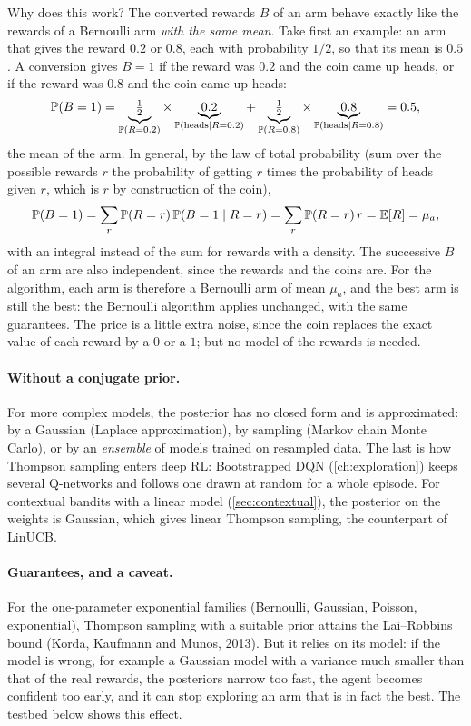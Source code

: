 Why does this work? The converted rewards $B$ of an arm behave exactly like
the rewards of a Bernoulli arm \emph{with the same mean}. Take first an
example: an arm that gives the reward $0.2$ or $0.8$, each with probability
$1/2$, so that its mean is $0.5$. A conversion gives $B = 1$ if the reward
was $0.2$ and the coin came up heads, or if the reward was $0.8$ and the
coin came up heads:
\begin{equation*}
  \mathbb{P}(B = 1) = \underbrace{\tfrac{1}{2}}_{\mathbb{P}(R = 0.2)} \times
  \underbrace{0.2}_{\mathbb{P}(\text{heads} \mid R = 0.2)} +
  \underbrace{\tfrac{1}{2}}_{\mathbb{P}(R = 0.8)} \times
  \underbrace{0.8}_{\mathbb{P}(\text{heads} \mid R = 0.8)} = 0.5,
\end{equation*}
the mean of the arm. In general, by the law of total probability (sum over
the possible rewards $r$ the probability of getting $r$ times the
probability of heads given $r$, which is $r$ by construction of the coin),
\begin{equation*}
  \mathbb{P}(B = 1) = \sum_r \mathbb{P}(R = r)\, \mathbb{P}(B = 1 \mid R = r) = \sum_r
  \mathbb{P}(R = r)\, r = \mathbb{E}[R] = \mu_a,
\end{equation*}
with an integral instead of the sum for rewards with a density. The
successive $B$ of an arm are also independent, since the rewards and the
coins are. For the algorithm, each arm is therefore a Bernoulli arm of mean
$\mu_a$, and the best arm is still the best: the Bernoulli algorithm applies
unchanged, with the same guarantees. The price is a little extra noise,
since the coin replaces the exact value of each reward by a $0$ or a $1$;
but no model of the rewards is needed.

\paragraph{Without a conjugate prior.} For more complex models, the
posterior has no closed form and is approximated: by a Gaussian (Laplace
approximation), by sampling (Markov chain Monte Carlo), or by an
\emph{ensemble} of models trained on resampled data. The last is how
Thompson sampling enters deep RL: Bootstrapped DQN (\cref{ch:exploration})
keeps several Q-networks and follows one drawn at random for a whole
episode. For contextual bandits with a linear model
(\cref{sec:contextual}), the posterior on the weights is Gaussian, which
gives linear Thompson sampling, the counterpart of LinUCB.

\paragraph{Guarantees, and a caveat.} For the one-parameter exponential
families (Bernoulli, Gaussian, Poisson, exponential), Thompson sampling with
a suitable prior attains the Lai--Robbins bound (Korda, Kaufmann and Munos,
2013). But it relies on its model: if the model is wrong, for example a
Gaussian model with a variance much smaller than that of the real rewards,
the posteriors narrow too fast, the agent becomes confident too early, and
it can stop exploring an arm that is in fact the best. The testbed below
shows this effect.

